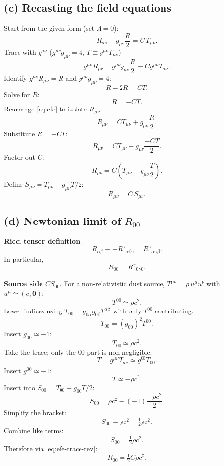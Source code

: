 \documentclass[11pt]{article}
\begin{document}
\subsection*{(c) Recasting the field equations}

Start from the given form (set $\Lambda=0$):
\begin{equation}
R_{\mu\nu}-g_{\mu\nu}\frac{R}{2}=C\,T_{\mu\nu}.
\label{eq:efe}
\end{equation}
Trace with $g^{\mu\nu}$ ($g^{\mu\nu}g_{\mu\nu}=4$, $T\equiv g^{\mu\nu}T_{\mu\nu}$):
\[ g^{\mu\nu}R_{\mu\nu}-g^{\mu\nu}g_{\mu\nu}\frac{R}{2}=C g^{\mu\nu}T_{\mu\nu}. \]
Identify $g^{\mu\nu}R_{\mu\nu}=R$ and $g^{\mu\nu}g_{\mu\nu}=4$:
\[ R-2R=CT. \]
Solve for $R$:
\[ R=-CT. \]
Rearrange \eqref{eq:efe} to isolate $R_{\mu\nu}$:
\[ R_{\mu\nu}=C T_{\mu\nu}+g_{\mu\nu}\frac{R}{2}. \]
Substitute $R=-CT$:
\[ R_{\mu\nu}=C T_{\mu\nu}+g_{\mu\nu}\frac{-CT}{2}. \]
Factor out $C$:
\[ R_{\mu\nu}=C\!\left(T_{\mu\nu}-g_{\mu\nu}\frac{T}{2}\right). \]
Define $S_{\mu\nu}=T_{\mu\nu}-g_{\mu\nu}T/2$:
\begin{equation}
\boxed{\;R_{\mu\nu}=C\,S_{\mu\nu}.\;}
\label{eq:efe-trace-rev}
\end{equation}

\subsection*{(d) Newtonian limit of $R_{00}$}

\textbf{Ricci tensor definition.}
\[ R_{\alpha\beta}\equiv -R^{\gamma}{}_{\alpha\beta\gamma}=R^{\gamma}{}_{\alpha\gamma\beta}. \]
In particular,
\begin{equation}
R_{00}=R^{\gamma}{}_{0\gamma 0}.
\label{eq:R00-def}
\end{equation}

\textbf{Source side $C S_{00}$.} For a non-relativistic dust source, $T^{\mu\nu}=\rho\, u^\mu u^\nu$ with $u^\mu\simeq(c,\bm 0)$:
\[ T^{00}\simeq \rho c^2. \]
Lower indices using $T_{00}=g_{0\alpha}g_{0\beta}T^{\alpha\beta}$ with only $T^{00}$ contributing:
\[ T_{00}=(g_{00})^2 T^{00}. \]
Insert $g_{00}\simeq-1$:
\[ T_{00}\simeq \rho c^2. \]
Take the trace; only the $00$ part is non-negligible:
\[ T=g^{\mu\nu}T_{\mu\nu}\simeq g^{00}T_{00}. \]
Insert $g^{00}\simeq-1$:
\[ T\simeq -\rho c^2. \]
Insert into $S_{00}=T_{00}-g_{00}T/2$:
\[ S_{00}=\rho c^2-(-1)\frac{-\rho c^2}{2}. \]
Simplify the bracket:
\[ S_{00}=\rho c^2-\tfrac12\rho c^2. \]
Combine like terms:
\[ S_{00}=\tfrac12\rho c^2. \]
Therefore via \eqref{eq:efe-trace-rev}:
\begin{equation}
R_{00}=\tfrac12 C\rho c^2.
\label{eq:R00-source}
\end{equation}
\end{document}
